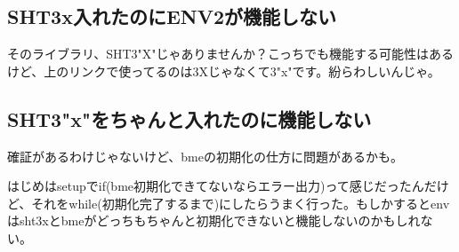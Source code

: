 \documentclass[fleqn,twocolumn]{mynote}
\begin{document}
  \subsection*{SHT3x入れたのにENV2が機能しない}
  そのライブラリ、SHT3"X"じゃありませんか？こっちでも機能する可能性はあるけど、上のリンクで使ってるのは3Xじゃなくて3"x"です。紛らわしいんじゃ。

  \subsection*{SHT3"x"をちゃんと入れたのに機能しない}
  確証があるわけじゃないけど、bmeの初期化の仕方に問題があるかも。

  はじめはsetupでif(bme初期化できてないならエラー出力)って感じだったんだけど、それをwhile(初期化完了するまで)にしたらうまく行った。もしかするとenvはsht3xとbmeがどっちもちゃんと初期化できないと機能しないのかもしれない。

  
  
  
\end{document}
